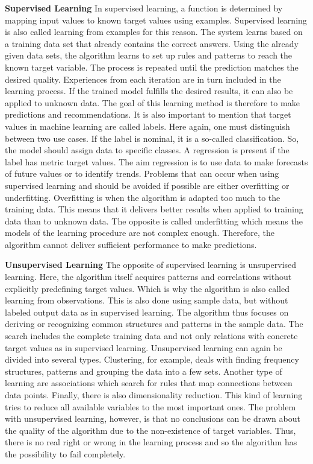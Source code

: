 \textbf{Supervised Learning}
In supervised learning, a function is determined by mapping input values to known target
values using examples. Supervised learning is also called learning from examples for this reason.\cite[96]{schacht2019blockchain}
The system learns based on a training data set that already contains the correct answers.
Using the already given data sets, the algorithm learns to set up rules and patterns to
reach the known target variable. The process is repeated until the prediction matches the desired quality.
Experiences from each iteration are in turn included in the learning process.
If the trained model fulfills the desired results, it can also be applied to unknown data.
The goal of this learning method is therefore to make predictions and recommendations.\cite[96]{schacht2019blockchain}
It is also important to mention that target values in machine learning are called labels.
Here again, one must distinguish between two use cases. If the label is nominal, it is a so-called
classification. So, the model should assign data to specific classes.
A regression is present if the label has metric target values.\cite[46]{Paass2020}
The aim regression is to use data to make forecasts of future values or to identify trends.
Problems that can occur when using supervised learning and should be avoided if possible
are either overfitting or underfitting.  Overfitting is when the algorithm is adapted too much
to the training data.
This means that it delivers better results when applied to training data than to unknown data.
The opposite is called underfitting which means the models of the learning procedure are not complex
enough.
Therefore, the algorithm cannot deliver sufficient performance to make predictions.\cite{buxmann2018künstliche}

\textbf{Unsupervised Learning}
The opposite of supervised learning is unsupervised learning.
Here, the algorithm itself acquires patterns and correlations without explicitly
predefining target values.
Which is why the algorithm is also called learning from observations.\cite[97]{schacht2019blockchain}
This is also done using sample data, but without labeled output data as in supervised learning.
The algorithm thus focuses on deriving or recognizing common structures and patterns in the sample data.\cite[7]{2018VDMAQuick}
The search includes the complete training data and not only relations with concrete
target values as in supervised learning.\cite[802]{ernst2016grundkurs}
Unsupervised learning can again be divided into several types.
Clustering, for example, deals with finding frequency structures, patterns and grouping the
data into a few sets.\cite[260]{Ertel2021}
Another type of learning are associations which search for rules that map connections between data points.
Finally, there is also dimensionality reduction. This kind of learning tries to reduce
all available variables to the most important ones.\cite[10]{FraunhoferMasch2018}
The problem with unsupervised learning, however, is that no conclusions can be drawn about
the quality of the algorithm due to the non-existence of target variables.
Thus, there is no real right or wrong in the learning process and so the algorithm has the possibility
to fail completely.\cite[97]{schacht2019blockchain}

